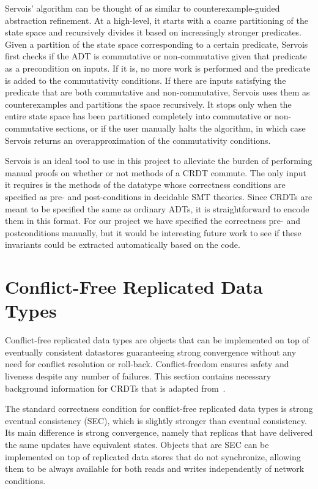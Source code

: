\documentclass{article}
\begin{document}
Servois' algorithm can be thought of as similar to counterexample-guided
abstraction refinement. At a high-level, it starts with a coarse partitioning of
the state space and recursively divides it based on increasingly stronger
predicates. Given a partition of the state space corresponding to a certain
predicate, Servois first checks if the ADT is commutative or non-commutative
given that predicate as a precondition on inputs. If it is, no more work is
performed and the predicate is added to the commutativity conditions. If there
are inputs satisfying the predicate that are both commutative and
non-commutative, Servois uses them as counterexamples and partitions the space
recursively. It stops only when the entire state space has been partitioned
completely into commutative or non-commutative sections, or if the user manually
halts the algorithm, in which case Servois returns an overapproximation of the
commutativity conditions.

Servois is an ideal tool to use in this project to alleviate the burden of
performing manual proofs on whether or not methods of a CRDT commute. The only
input it requires is the methods of the datatype whose correctness conditions
are specified as pre- and post-conditions in decidable SMT theories. Since CRDTs
are meant to be specified the same as ordinary ADTs, it is straightforward to
encode them in this format. For our project we have specified the correctness
pre- and postconditions manually, but it would be interesting future work to see
if these invariants could be extracted automatically based on the code.

\section{Conflict-Free Replicated Data Types}

Conflict-free replicated data types are objects that can be
implemented on top of eventually consistent datastores guaranteeing
strong convergence without any need for conflict resolution or
roll-back. Conflict-freedom ensures safety and liveness despite any
number of failures. This section contains necessary background
information for CRDTs that is adapted from~\cite{shapiro2011conflict}.

The standard correctness condition for conflict-free replicated data
types is strong eventual consistency (SEC), which is slightly stronger
than eventual consistency. Its main difference is strong convergence,
namely that replicas that have delivered the same updates have
equivalent states. Objects that are SEC can be implemented on top of
replicated data stores that do not synchronize, allowing them to be
always available for both reads and writes independently of network
conditions.
\end{document}

